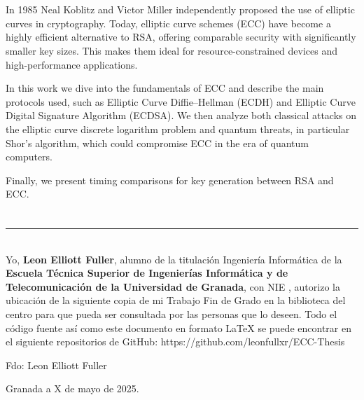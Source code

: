 \\

\vspace{0.7cm}
\\
In 1985 Neal Koblitz and Victor Miller independently proposed the use of elliptic curves in cryptography. Today, elliptic curve schemes (ECC) have become a highly efficient alternative to RSA, offering comparable security with significantly smaller key sizes. This makes them ideal for resource-constrained devices and high-performance applications.

In this work we dive into the fundamentals of ECC and describe the main protocols used, such as Elliptic Curve Diffie–Hellman (ECDH) and Elliptic Curve Digital Signature Algorithm (ECDSA). We then analyze both classical attacks on the elliptic curve discrete logarithm problem and quantum threats, in particular Shor’s algorithm, which could compromise ECC in the era of quantum computers.

Finally, we present timing comparisons for key generation between RSA and ECC.

\chapter*{}
\thispagestyle{empty}

\noindent\rule[-1ex]{\textwidth}{2pt}\\[4.5ex]

Yo, \textbf{Leon Elliott Fuller}, alumno de la titulación Ingeniería Informática de la \textbf{Escuela Técnica Superior
de Ingenierías Informática y de Telecomunicación de la Universidad de Granada}, con NIE \myNIE, autorizo la ubicación de la siguiente copia de mi Trabajo Fin de Grado en la biblioteca del centro para que pueda ser consultada por las personas que lo deseen. Todo el código fuente así como este documento en formato LaTeX se puede encontrar en el siguiente repositorios de GitHub: https://github.com/leonfullxr/ECC-Thesis

\vspace{6cm}

\noindent Fdo: Leon Elliott Fuller

\vspace{2cm}

\begin{flushright}
Granada a X de mayo de 2025.
\end{flushright}


